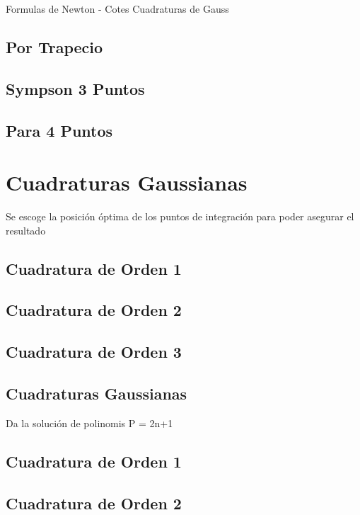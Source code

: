 Formulas de Newton - Cotes
Cuadraturas de Gauss

\subsection{Por Trapecio}

\subsection{Sympson 3 Puntos}

\subsection{Para 4 Puntos}

\section{Cuadraturas Gaussianas}
Se escoge la posici\'on \'optima de los puntos de integraci\'on para poder asegurar el resultado


\subsection{Cuadratura de Orden 1}

\subsection{Cuadratura de Orden 2}

\subsection{Cuadratura de Orden 3}

\subsection{Cuadraturas Gaussianas}
Da la soluci\'on de polinomis P = 2n+1


\subsection{Cuadratura de Orden 1}

\subsection{Cuadratura de Orden 2}

